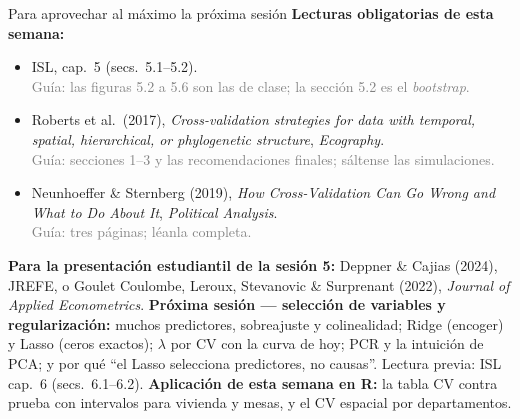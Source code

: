 \documentclass{beamer}
\newcommand{\1}{\mathbb{I}}
\begin{document}
\begin{frame}{Para aprovechar al máximo la próxima sesión}
\small
\textbf{Lecturas obligatorias de esta semana:}
\begin{itemize}\itemsep4pt
  \item ISL, cap.\ 5 (secs.\ 5.1--5.2). \\ \textcolor{gray}{Guía: las figuras 5.2 a 5.6 son las de clase; la sección 5.2 es el \emph{bootstrap}.}
  \item Roberts et al.\ (2017), \emph{Cross-validation strategies for data with temporal, spatial, hierarchical, or phylogenetic structure}, \emph{Ecography}. \\ \textcolor{gray}{Guía: secciones 1--3 y las recomendaciones finales; sáltense las simulaciones.}
  \item Neunhoeffer \& Sternberg (2019), \emph{How Cross-Validation Can Go Wrong and What to Do About It}, \emph{Political Analysis}. \\ \textcolor{gray}{Guía: tres páginas; léanla completa.}
\end{itemize}
\textbf{Para la presentación estudiantil de la sesión 5:} Deppner \& Cajias (2024), JREFE, o Goulet Coulombe, Leroux, Stevanovic \& Surprenant (2022), \emph{Journal of Applied Econometrics}.
\pause
\vspace{0.1cm}
\textbf{Próxima sesión --- selección de variables y regularización:} muchos predictores, sobreajuste y colinealidad; Ridge (encoger) y Lasso (ceros exactos); $\lambda$ por CV con la curva de hoy; PCR y la intuición de PCA; y por qué ``el Lasso selecciona predictores, no causas''. Lectura previa: ISL cap.\ 6 (secs.\ 6.1--6.2).
\pause
\vspace{0.1cm}
\textbf{Aplicación de esta semana en R:} la tabla CV contra prueba con intervalos para vivienda y mesas, y el CV espacial por departamentos.
\end{frame}
\end{document}
